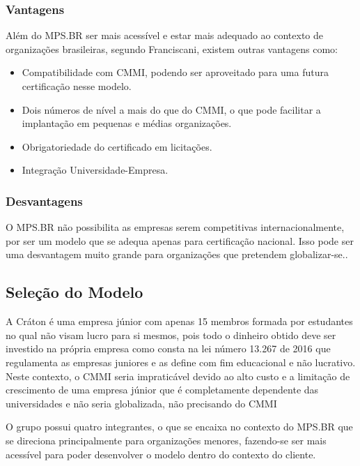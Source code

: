 \subsubsection{Vantagens}

  Além do MPS.BR ser mais acessível e estar mais adequado ao contexto de
  organizações brasileiras, segundo Franciscani, existem outras vantagens
  como:

  \begin{itemize}
    \item{Compatibilidade com CMMI, podendo ser aproveitado para uma futura
          certificação nesse modelo.}
    \item{Dois números de nível a mais do que do CMMI, o que pode facilitar a
          implantação em pequenas e médias organizações.}
    \item{Obrigatoriedade do certificado em licitações.}
    \item{Integração Universidade-Empresa.}
  \end{itemize}

\subsubsection{Desvantagens}

  O MPS.BR não possibilita as empresas serem competitivas internacionalmente,
  por ser um modelo que se adequa apenas para certificação nacional. Isso pode
  ser uma desvantagem muito grande para organizações que pretendem
  globalizar-se.\cite{francis2012}.

\subsection{Seleção do Modelo}

  A Cráton é uma empresa júnior com apenas 15 membros formada por estudantes no qual
  não visam lucro para si mesmos, pois todo o dinheiro obtido deve ser investido
  na própria empresa como consta na lei número 13.267 de 2016 que regulamenta as empresas
  juniores e as define com fim educacional e não lucrativo. Neste contexto, o CMMI seria
  impraticável devido ao alto custo e a limitação de crescimento de uma empresa júnior que é
  completamente dependente das universidades e não seria globalizada, não precisando do CMMI

  O grupo possui quatro integrantes, o que se encaixa no contexto do MPS.BR que se direciona
  principalmente para organizações menores, fazendo-se ser mais acessível para poder desenvolver
  o modelo dentro do contexto do cliente.

